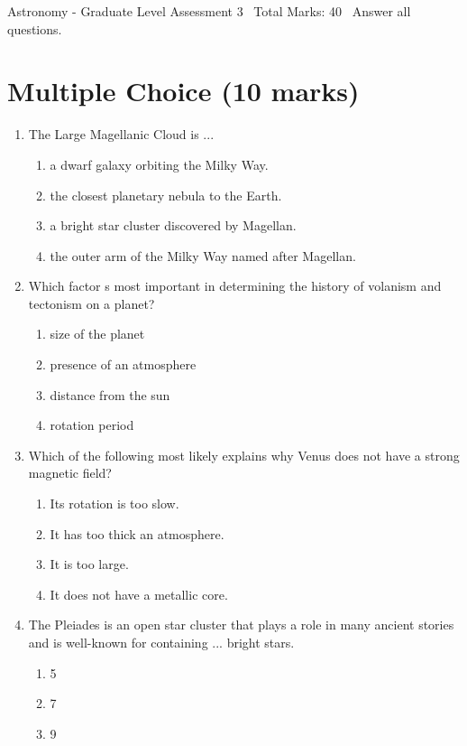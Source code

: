 \documentclass[12pt]{article}
\begin{document}
\begin{center}
Astronomy - Graduate Level Assessment 3 \
Total Marks: 40 \
Answer all questions.
\end{center}

\section*{Multiple Choice (10 marks)}
\begin{enumerate}[label=\arabic*.]
\item The Large Magellanic Cloud is ...
\begin{enumerate}[label=(\alph*)]
    \item a dwarf galaxy orbiting the Milky Way.
    \item the closest planetary nebula to the Earth.
    \item a bright star cluster discovered by Magellan.
    \item the outer arm of the Milky Way named after Magellan.
\end{enumerate}
\item Which factor s most important in determining the history of volanism and tectonism on a planet?
\begin{enumerate}[label=(\alph*)]
    \item size of the planet
    \item presence of an atmosphere
    \item distance from the sun
    \item rotation period
\end{enumerate}
\item Which of the following most likely explains why Venus does not have a strong magnetic field?
\begin{enumerate}[label=(\alph*)]
    \item Its rotation is too slow.
    \item It has too thick an atmosphere.
    \item It is too large.
    \item It does not have a metallic core.
\end{enumerate}
\item The Pleiades is an open star cluster that plays a role in many ancient stories and is well-known for containing ... bright stars.
\begin{enumerate}[label=(\alph*)]
    \item 5
    \item 7
    \item 9

\end{enumerate}
\end{enumerate}
\end{document}
